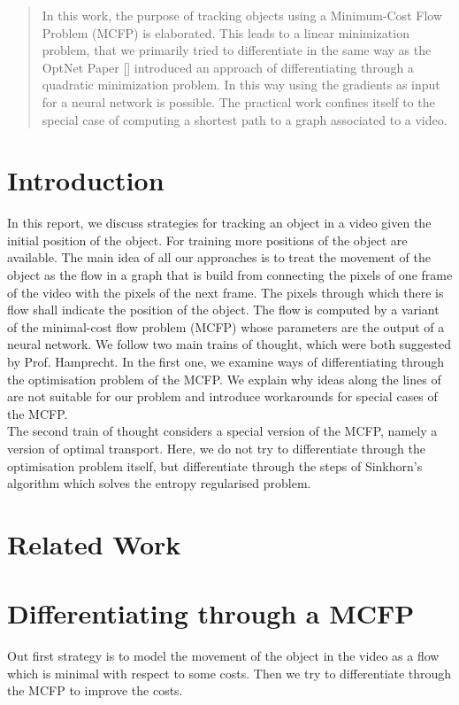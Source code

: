 \documentclass{article}
\begin{document}
\printAffiliationsAndNotice{\icmlEqualContribution} %

\begin{abstract}
In this work, the purpose of tracking objects using a Minimum-Cost Flow Problem (MCFP) is elaborated. This leads to a linear minimization problem, that we primarily tried to differentiate in the same way as the OptNet Paper [] introduced an approach of differentiating through a quadratic minimization problem. In this way using the gradients as input for a neural network is possible. The practical work confines itself to the special case of computing a shortest path to a graph associated to a video. 
\end{abstract}


\section{Introduction}
In this report, we discuss strategies for tracking an object in a video given the initial position of the object. For training more positions of the object are available. The main idea of all our approaches is to treat the movement of the object as the flow in a graph that is build from connecting the pixels of one frame of the video with the pixels of the next frame. The pixels through which there is flow shall indicate the position of the object. The flow is computed by a variant of the minimal-cost flow problem (MCFP) whose parameters are the output of a neural network. We follow two main trains of thought, which were both suggested by Prof. Hamprecht. In the first one, we examine ways of differentiating through the optimisation problem of the MCFP. We explain why ideas along the lines of \cite{AmosK17} are not suitable for our problem and introduce workarounds for special cases of the MCFP.\\
The second train of thought considers a special version of the MCFP, namely a version of optimal transport. Here, we do not try to differentiate through the optimisation problem itself, but differentiate through the steps of Sinkhorn's algorithm which solves the entropy regularised problem.

\section{Related Work}


\section{Differentiating through a MCFP}
Out first strategy is to model the movement of the object in the video as a flow which is minimal with respect to some costs. Then we try to differentiate through the MCFP to improve the costs.
\end{document}
